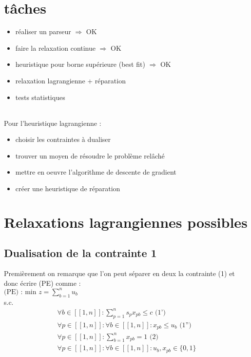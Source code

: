 \documentclass{article}
\begin{document}
\section{tâches}

\begin{itemize}
    \item réaliser un parseur $\Rightarrow$ OK
    \item faire la relaxation continue $\Rightarrow$ OK
    \item heuristique pour borne supérieure (best fit) $\Rightarrow$ OK
    \item relaxation lagrangienne + réparation
    \item tests statistiques
\end{itemize}
~\\
Pour l'heuristique lagrangienne :
\begin{itemize}
    \item choisir les contraintes à dualiser
    \item trouver un moyen de résoudre le problème relâché
    \item mettre en oeuvre l'algorithme de descente de gradient
    \item créer une heuristique de réparation
\end{itemize}

\section{Relaxations lagrangiennes possibles}

\subsection{Dualisation de la contrainte 1}
Premièrement on remarque que l'on peut séparer en deux la contrainte (1) et donc écrire (PE) comme : \\
$\text{(PE) : min } z = \sum \limits_{b = 1 }^{n} u_b$\\
s.c.
\begin{align*}
 \forall b \in [\![ 1 , n ]\!] : \sum \limits_{p = 1}^{n} s_p x_{pb} \leqslant c \text{ (1')}\\
 \forall p \in [\![ 1 , n ]\!] : \forall b \in [\![ 1 , n ]\!] : x_{pb} \leqslant u_b \text{ (1'')}\\
 \forall p \in [\![ 1 , n ]\!] : \sum \limits_{b = 1}^{n} x_{pb} = 1 \text{ (2)}\\
 \forall p \in [\![ 1 , n ]\!] : \forall b \in [\![ 1 , n ]\!] : u_b , x_{pb} \in \{0,1\}
\end{align*}
\end{document}

